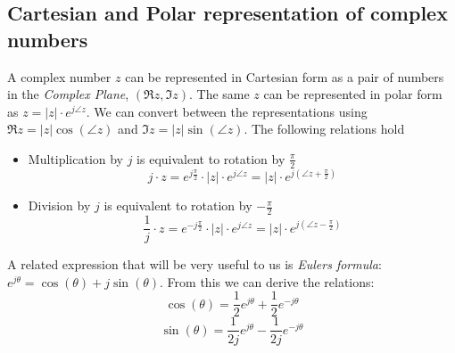 \subsection*{Cartesian and Polar representation of complex numbers}

A complex number $z$ can be represented in Cartesian form as a pair of numbers in the \textit{Complex Plane}, $(\Re{z},\Im{z})$. The same $z$ can be represented in polar form as $z = |z|\cdot e^{j\angle z}$. We can convert between the representations using  $\Re{z} = |z| \cos(\angle z)$ and $\Im{z} = |z| \sin(\angle z)$. The following relations hold

\begin{itemize}
\item Multiplication by $j$ is equivalent to rotation by $\tfrac{\pi}{2}$
\[
j\cdot z = e^{j\tfrac{\pi}{2}}\cdot |z|\cdot e^{j\angle z} = |z|\cdot e^{j(\angle z + \tfrac{\pi}{2})} 
\]
\item Division by $j$ is equivalent to rotation by $- \tfrac{\pi}{2}$
\[
\frac{1}{j}\cdot z = e^{-j\tfrac{\pi}{2}}\cdot |z|\cdot e^{j\angle z} = |z|\cdot e^{j(\angle z - \tfrac{\pi}{2})} 
\]
\end{itemize}

A related expression that will be very useful to us is \textit{Eulers formula}: $e^{j\theta} = \cos(\theta) + j\sin(\theta)$. From this we can derive the relations:
\[
\cos(\theta) = \frac{1}{2} e^{j\theta} + \frac{1}{2} e^{-j\theta} 
\]
\[
\sin(\theta) = \frac{1}{2j} e^{j\theta} - \frac{1}{2j} e^{-j\theta} 
\]

